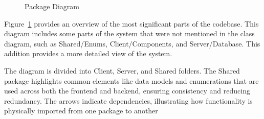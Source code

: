 \documentclass[11pt,a4paper]{article}
\newcommand{\inputdiagram}[1]{}
\newcommand{\textwidthdiagram}[2][1]{%
  \resizebox{#1\textwidth}{!}{\inputdiagram{#2}}%
}
\begin{document}
\begin{figure}[H]
    \centering
    \textwidthdiagram{Package_Diagram.latex}
    \caption{Package Diagram} 
    \label{fig:united_package}
\end{figure}

Figure~\ref{fig:united_package} provides an overview of the most significant parts of the codebase. This diagram includes some parts of the system that were not mentioned in the class diagram, such as Shared/Enums, Client/Components, and Server/Database. This addition provides a more detailed view of the system.

The diagram is divided into Client, Server, and Shared folders. The Shared package highlights common elements like data models and enumerations that are used across both the frontend and backend, ensuring consistency and reducing redundancy. The arrows indicate dependencies, illustrating how functionality is physically imported from one package to another

\begin{comment}

\begin{figure}[H]
    \centering
    \textwidthdiagram{frontend_package.latex}
    \caption{Frontend Package Diagram}
    \label{fig:frontend_package}
\end{figure}

Figure~\ref{fig:frontend_package} illustrates the modular organization of the frontend application. It clearly separates concerns into reusable Components for UI elements, higher-level UI Modules representing specific screens or functionalities, and a Services Package that handles data fetching, state management, and interaction with the backend.


\begin{figure}[H]
    \centering
    \textwidthdiagram{backend_package.latex}
    \caption{Backend Package Diagram}
    \label{fig:backend_package}
\end{figure}

Figure~\ref{fig:backend_package} delves into the internal structure of the backend system. It showcases a well-defined separation of responsibilities. Game Modules encapsulate the specific logic for each game. Repositories handle data persistence, abstracting away the underlying database interactions defined in the Database Context. The Statistics package focuses on calculating and managing game statistics. Finally, the Game Package seems to provide a more general layer for game management operations, potentially orchestrating interactions between other backend components. The dependencies clearly show how these packages interact to deliver the backend functionality.
\end{comment}
\end{document}
